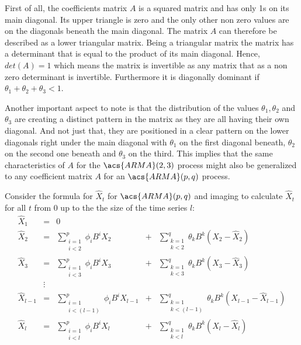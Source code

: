 First of all, the coefficients matrix $A$ is a squared matrix and has only 1s on its main diagonal. Its  upper triangle is zero and the only other non zero values are on the diagonals beneath the main diagonal. The matrix $A$ can therefore be described as a lower triangular matrix.
Being a triangular matrix the matrix has a determinant that is equal to the product of its main diagonal. Hence, $det(A)=1$ which means the matrix is invertible as any matrix that as a non zero determinant is invertible. Furthermore it is diagonally dominant if $\theta_1 + \theta_2 + \theta_3 < 1$. 

Another important aspect to note is that the distribution of the values $\theta_1, \theta_2$ and $\theta_3$ are creating a distinct pattern in the matrix as they are all having their own diagonal. And not just that, they are positioned in a clear pattern on the lower diagonals right under the main diagonal with $\theta_1$ on the first diagonal beneath, $\theta_2$ on the second one beneath and $\theta_3$ on the third. This implies that the same characteristics of $A$ for the $\acs{ARMA}(2,3)$ process might also be generalized to any coefficient matrix $A$ for an $\acs{ARMA}(p,q)$ process.

Consider the formula for $\hat{X}_t$ for $\acs{ARMA}(p,q)$ and imaging to calculate $\hat{X}_t$ for all $t$ from 0 up to the the size of the time series $l$: 
\begin{equation}\label{eq:ARMA_hat_p_q_full}
    \begin{array}{rcccc}
        \hat{X}_{1} &=& 0 \\
        \hat{X}_{2} &=& \displaystyle\sum_{\substack{i=1 \\ i < 2}}^{p} \phi_i B^i X_{2} &+& \displaystyle\sum_{\substack{k=1 \\ k < 2}}^{q} \theta_k B^k (X_{2}-\hat{X}_{2})\\
        \hat{X}_{3} &=& \displaystyle\sum_{\substack{i=1 \\ i < 3}}^{p} \phi_i B^i X_{3} &+& \displaystyle\sum_{\substack{k=1 \\ k < 3}}^{q} \theta_k B^k (X_{3}-\hat{X}_{3})\\
         &\vdots&&&\\
        \hat{X}_{l-1} &=& \displaystyle\sum_{\substack{i=1 \\ i < (l-1)}}^{p} \phi_i B^i X_{l-1} &+& \displaystyle\sum_{\substack{k=1 \\ k < (l-1)}}^{q} \theta_k B^k (X_{l-1}-\hat{X}_{l-1})\\
        \hat{X}_{l} &=& \displaystyle\sum_{\substack{i=1 \\ i < l}}^{p} \phi_i B^i X_{l} &+& \displaystyle\sum_{\substack{k=1 \\ k < l}}^{q} \theta_k B^k (X_{l}-\hat{X}_{l})\\
    \end{array}
\end{equation}

